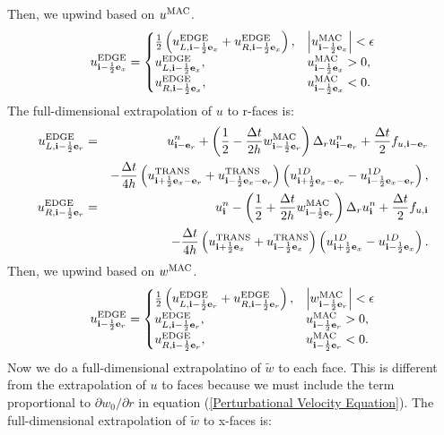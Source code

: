 \documentclass[11pt]{article}
\def\half  {\frac{1}{2}}
\def\dt    {\Delta t}
\def\edge  {\rm EDGE}
\def\mac   {\rm MAC}
\def\trans {\rm TRANS}
\def\eb    {{\bf e}}
\def\ib    {{\bf i}}
\def\wt    {\tilde{w}}
\begin{document}
Then, we upwind based on $u^{\mac}$.
\begin{equation}
u_{\ib-\half\eb_x}^{\edge} =
\begin{cases}
\half\left(u_{L,\ib-\half\eb_x}^{\edge} + u_{R,\ib-\half\eb_x}^{\edge}\right), & \left|u^{\mac}_{\ib-\half\eb_x}\right| < \epsilon \\
u_{L,\ib-\half\eb_x}^{\edge}, & u^{\mac}_{\ib-\half\eb_x} > 0, \\
u_{R,\ib-\half\eb_x}^{\edge}, & u^{\mac}_{\ib-\half\eb_x} < 0.
\end{cases}
\end{equation}
The full-dimensional extrapolation of $u$ to r-faces is:
\begin{eqnarray}
u_{L,\ib-\half\eb_r}^{\edge} &=& u_{\ib-\eb_r}^n + \left(\half - \frac{\dt}{2h}w_{\ib-\half\eb_r}^{\mac}\right)\Delta_r u_{\ib-\eb_r}^n + \frac{\dt}{2}f_{u,\ib-\eb_r} \nonumber \\
&& - \frac{\dt}{4h}\left(u_{\ib+\half\eb_x-\eb_r}^{\trans}+u_{\ib-\half\eb_x-\eb_r}^{\trans}\right)\left(u_{\ib+\half\eb_x-\eb_r}^{1D} - u_{\ib-\half\eb_x-\eb_r}^{1D}\right),  \\
u_{R,\ib-\half\eb_r}^{\edge} &=& u_{\ib}^n - \left(\half + \frac{\dt}{2h}w_{\ib-\half\eb_r}^{\mac}\right)\Delta_r u_{\ib}^n + \frac{\dt}{2}f_{u,\ib} \nonumber \\
&& - \frac{\dt}{4h}\left(u_{\ib+\half\eb_x}^{\trans}+u_{\ib-\half\eb_x}^{\trans}\right)\left(u_{\ib+\half\eb_x}^{1D} - u_{\ib-\half\eb_x}^{1D}\right). 
\end{eqnarray}
Then, we upwind based on $w^{\mac}$.
\begin{equation}
u_{\ib-\half\eb_r}^{\edge} =
\begin{cases}
\half\left(u_{L,\ib-\half\eb_r}^{\edge} + u_{R,\ib-\half\eb_r}^{\edge}\right), & \left|w^{\mac}_{\ib-\half\eb_r}\right| < \epsilon \\
u_{L,\ib-\half\eb_r}^{\edge}, & u^{\mac}_{\ib-\half\eb_r} > 0, \\
u_{R,\ib-\half\eb_r}^{\edge}, & u^{\mac}_{\ib-\half\eb_r} < 0.
\end{cases}
\end{equation}
Now we do a full-dimensional extrapolatino of $\wt$ to each face.  This is different from the extrapolation of $u$ to faces because we must include the term proportional to $\partial w_0/\partial r$ in equation (\ref{Perturbational Velocity Equation}).  The full-dimensional extrapolation of $\wt$ to x-faces is:
\end{document}

